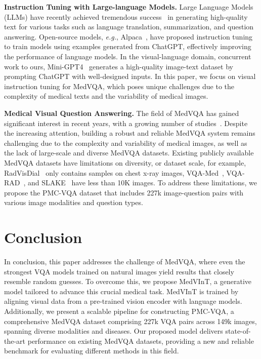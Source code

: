 \documentclass{article}
\begin{document}
\noindent \textbf{Instruction Tuning with Large-language Models.} 
Large Language Models (LLMs) have recently achieved tremendous success~\cite{ouyang2022training,openai2023gpt4,chatgpt} in generating high-quality text for various tasks such as language translation, summarization, and question answering. 
Open-source models, \emph{e.g.}, Alpaca~\cite{alpaca}, have proposed instruction tuning to train models using examples generated from ChatGPT\cite{chatgpt}, effectively improving the performance of language models. 
In the visual-language domain, concurrent work to ours, Mini-GPT4~\cite{zhu2023minigpt} generates a high-quality image-text dataset by prompting ChatGPT with well-designed inputs. In this paper, we focus on visual instruction tuning for MedVQA, which poses unique challenges due to the complexity of medical texts and the variability of medical images.


\textbf{Medical Visual Question Answering.}
The field of MedVQA has gained significant interest in recent years, with a growing number of studies~\cite{lin2022medical}. Despite the increasing attention, building a robust and reliable MedVQA system remains challenging due to the complexity and variability of medical images, as well as the lack of large-scale and diverse MedVQA datasets. Existing publicly available MedVQA datasets have limitations on diversity,
or dataset scale, for example, RadVisDial~\cite{kovaleva2020towards} only contains samples on chest x-ray images, VQA-Med~\cite{ben2021overview}, VQA-RAD~\cite{lau2018dataset}, and SLAKE~\cite{liu2021slake} have less than 10K images. 
To address these limitations, we propose the PMC-VQA dataset that includes 227k image-question pairs with various image modalities and question types.

 
\section{Conclusion}
In conclusion, this paper addresses the challenge of MedVQA, where even the strongest VQA models trained on natural images yield results that closely resemble random guesses. 
To overcome this,
we propose MedVInT, a generative model tailored to 
advance this crucial medical task.
MedVInT is trained by aligning visual data from a pre-trained vision encoder with language models. 
Additionally, we present a scalable pipeline for constructing PMC-VQA, a comprehensive MedVQA dataset comprising 227k VQA pairs across 149k images, spanning diverse modalities and diseases. 
Our proposed model delivers state-of-the-art performance on existing MedVQA datasets, providing a new and reliable benchmark for evaluating different methods in this field.
\end{document}
